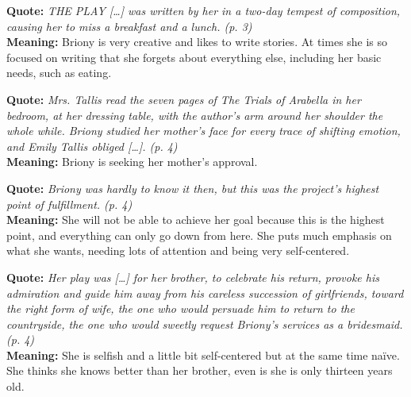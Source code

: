 \documentclass[a4paper]{article}
\newcommand*\circled[1]{\tikz[baseline=(char.base)]{
            \node[shape=circle,draw,inner sep=2pt] (char) {#1};}}
\newcommand\hr{\par\vspace{-.5\ht\strutbox}\noindent\hrulefill\par}
\begin{document}
\begin{minipage}[l]{0.05\textwidth}
    \circled{1}
\end{minipage}
\begin{minipage}[r]{0.95\textwidth}
    \textbf{Quote:} \textit{
        THE PLAY […] was written by her in a two-day tempest of
        composition, causing her to miss a breakfast and a lunch.
        (p. 3)
    }
    \\
    \textbf{Meaning:}
    Briony is very creative and likes to write stories.
    At times she is so focused on writing that she
    forgets about everything else, including her
    basic needs, such as eating.
\end{minipage}
\hr
\begin{minipage}[l]{0.05\textwidth}
    \circled{2}
\end{minipage}
\begin{minipage}[r]{0.95\textwidth}
    \textbf{Quote:} \textit{
        Mrs. Tallis read the seven pages of The Trials of Arabella
        in her bedroom, at her dressing table, with the author's
        arm around her shoulder the whole while. Briony studied
        her mother's face for every trace of shifting emotion, and
        Emily Tallis obliged […]. (p. 4)
    }
    \\
    \textbf{Meaning:} Briony is seeking her mother's approval.
\end{minipage}
\hr
\begin{minipage}[l]{0.05\textwidth}
    \circled{3}
\end{minipage}
\begin{minipage}[r]{0.95\textwidth}
    \textbf{Quote:} \textit{
        Briony was hardly to know it then, but this was the
        project's highest point of fulfillment. (p. 4)
    }
    \\
    \textbf{Meaning:} She will not be able to achieve her goal because this is the highest point,
    and everything can only go down from here. She puts much emphasis on what she wants,
    needing lots of attention and being very self-centered.
\end{minipage}
\hr
\begin{minipage}[l]{0.05\textwidth}
    \circled{4}
\end{minipage}
\begin{minipage}[r]{0.95\textwidth}
    \textbf{Quote:} \textit{
        Her play was […] for her brother, to celebrate his return,
        provoke his admiration and guide him away from his
        careless succession of girlfriends, toward the right form
        of wife, the one who would persuade him to return to the
        countryside, the one who would sweetly request Briony's
        services as a bridesmaid. (p. 4)
    }
    \\
    \textbf{Meaning:} She is selfish and a little bit self-centered but at the same time naïve.
    She thinks she knows better than her brother, even is she is only thirteen years old.
\end{minipage}
\end{document}

